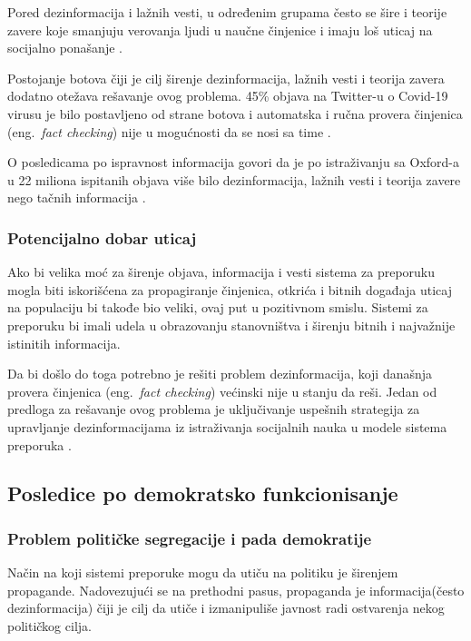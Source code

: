\documentclass[a4paper]{article}
\begin{document}
Pored dezinformacija i lažnih vesti, u određenim grupama često se šire i teorije zavere koje smanjuju verovanja ljudi u naučne činjenice i imaju loš uticaj na socijalno ponašanje \cite{van_der_Linden_2015}.

Postojanje botova čiji je cilj širenje dezinformacija, lažnih vesti i teorija zavera dodatno otežava rešavanje ovog problema. 45\% objava na Twitter-u o Covid-19 virusu je bilo postavljeno od strane botova \cite{NPR_2020} i automatska i ručna provera činjenica (eng.~{\em fact checking}) nije u mogućnosti da se nosi sa time \cite{Jon-Patrick_Allem}.

O posledicama po ispravnost informacija govori da je po istraživanju sa Oxford-a u 22 miliona ispitanih objava više bilo dezinformacija, lažnih vesti i teorija zavere nego tačnih informacija \cite{Howard}.


\subsubsection{Potencijalno dobar uticaj}
\label{subsec:potencijal_informacije 2}


Ako bi velika moć za širenje objava, informacija i vesti sistema za preporuku mogla biti iskorišćena za propagiranje činjenica, otkrića i bitnih događaja uticaj na populaciju bi takođe bio veliki, ovaj put u pozitivnom smislu. Sistemi za preporuku bi imali udela u obrazovanju stanovništva i širenju bitnih i najvažnije istinitih informacija.

Da bi došlo do toga potrebno je rešiti problem dezinformacija, koji današnja provera činjenica (eng.~{\em fact checking}) većinski nije u stanju da reši. Jedan od predloga za rešavanje ovog problema je uključivanje uspešnih strategija za upravljanje dezinformacijama iz istraživanja socijalnih nauka u modele sistema preporuka  \cite{fernandez2020recommender}.


\subsection{Posledice po demokratsko funkcionisanje}
\label{subsec: posledice_demokratija 2}


\subsubsection{Problem političke segregacije i pada demokratije}
\label{subsec: problem_demokratija 1}


Način na koji sistemi preporuke mogu da utiču na politiku je širenjem propagande. Nadovezujući se na prethodni pasus, propaganda je informacija(često dezinformacija) čiji je cilj da utiče i izmanipuliše javnost radi ostvarenja nekog političkog cilja.
\end{document}
